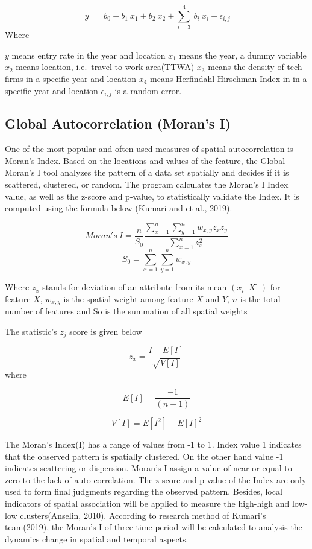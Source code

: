\documentclass[
  12pt,
  oneside]{book}
\begin{document}
\[
\ y\ =\ b_0 + b_1 \ x_1 + b_2 \ x_2 + \sum_{i=3}^{4} \ b_i \ x_i + \epsilon_{i,j}
\]
Where

\(y\) means entry rate in the year and location
\(x_1\) means the year, a dummy variable
\(x_2\) means location, i.e.~travel to work area(TTWA)
\(x_3\) means the density of tech firms in a specific year and location
\(x_4\) means Herfindahl-Hirschman Index in in a specific year and location
\(\epsilon_{i,j}\) is a random error.

\hypertarget{global-autocorrelation-morans-i}{%
\subsection{Global Autocorrelation (Moran's I)}\label{global-autocorrelation-morans-i}}

One of the most popular and often used measures of spatial autocorrelation is Moran's Index. Based on the locations and values of the feature, the Global Moran's I tool analyzes the pattern of a data set spatially and decides if it is scattered, clustered, or random. The program calculates the Moran's I Index value, as well as the z-score and p-value, to statistically validate the Index. It is computed using the formula below (Kumari and et al., 2019).

\[
Moran's \ I = \frac{n}{S_0} \frac{\sum_{x=1}^n \sum_{y=1}^n w_{x,y} z_x z_y}{\sum_{x=1}^n z_x^2}
\]
\[
S_0 = \sum_{x=1}^n \sum_{y=1}^n w_{x,y}
\]

Where \(z_x\) stands for deviation of an attribute from its mean \((x_i – X̅)\) for feature \(X\), \(w_{x,y}\) is the spatial weight among feature \(X\) and \(Y\), \(n\) is the total number of features and So is the summation of all spatial weights

The statistic's \(z_j\) score is given below

\[ 
z_x = \frac{I - E[I]}{\sqrt{V[I]}}
\]
where

\[
E[I] = \frac{-1}{(n-1)}
\]

\[
V[I] = E[I^2]-E[I]^2
\]

The Moran's Index(I) has a range of values from -1 to 1. Index value 1 indicates that the observed pattern is spatially clustered. On the other hand value -1 indicates scattering or dispersion. Moran's I assign a value of near or equal to zero to the lack of auto correlation. The z-score and p-value of the Index are only used to form final judgments regarding the observed pattern. Besides, local indicators of spatial association will be applied to measure the high-high and low-low clusters(Anselin, 2010). According to research method of Kumari's team(2019), the Moran's I of three time period will be calculated to analysis the dynamics change in spatial and temporal aspects.
\end{document}
